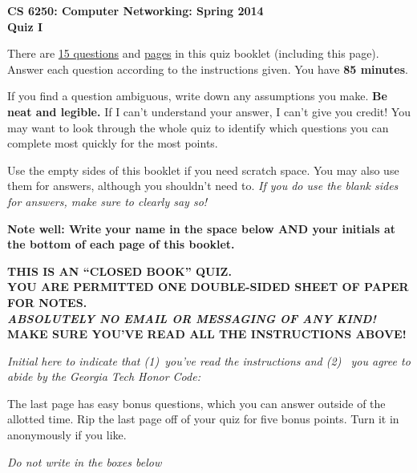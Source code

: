 \documentclass[11pt]{article}
\begin{document}
\begin{center}
{\Large{\bf CS 6250: Computer Networking: Spring 2014} \\
 \vspace{.15in} \Huge{\bf Quiz I}} 

\begin{boxedminipage}[h]{6in}
There are \underline{15 questions} and \underline{\pageref{lastpage}
  pages} in this quiz booklet (including this page).  Answer each
question according to the instructions given.  You have {\bf 85
  minutes}.



\vspace{.1in} 
If you find a question ambiguous, write down any
assumptions you make.  {\bf Be neat and legible.}  If I can't
understand your answer, I can't give you credit!  You may want to look
through the whole quiz to identify which questions you can complete most
quickly for the most points.

\vspace{.1in} 
Use the empty sides of this booklet if you need scratch space.  You
may also use them for answers, although you shouldn't need to.  {\em If you
do use the blank sides for answers, make sure to clearly say so!}

\vspace{.1in} 
{\bf Note well: Write your name in the space below AND your initials at the bottom of each
page of this booklet.}

\begin{center}{\bf THIS IS AN ``CLOSED BOOK'' QUIZ.\\
YOU ARE PERMITTED ONE DOUBLE-SIDED SHEET OF PAPER FOR NOTES.\\
{\em ABSOLUTELY NO EMAIL OR MESSAGING OF ANY KIND!} \\
MAKE SURE YOU'VE READ ALL THE INSTRUCTIONS ABOVE!}
\end{center}
{\em Initial here to indicate that (1)~you've read the instructions and (2)~
you agree to abide by the Georgia Tech Honor Code: }

\vspace{.1in} The last page has easy bonus questions, which you can
answer outside of the allotted time.  Rip the last page off of your
quiz for five bonus points.  Turn it in anonymously if you like.

\end{boxedminipage}
\end{center}
\vspace*{0.25in}
\begin{center}
{\it Do not write in the boxes below}
\end{center}
\end{document}
